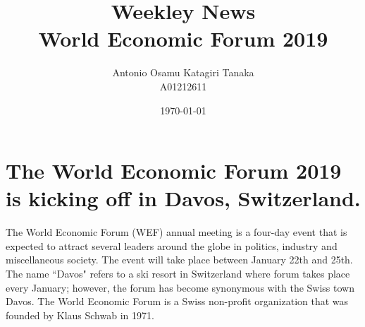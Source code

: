 \documentclass[11pt,a4paper]{article}
\title
{
    Weekley News \\
    World Economic Forum 2019
}
\author
{
    Antonio Osamu Katagiri Tanaka \\
    A01212611
}
\date{\today}
\providecommand{\keywords}[1]
{
    \\
    \\
    \small
    \textbf{\textit{Keywords:}} #1
}
\begin{document}

\maketitle








\section*{The World Economic Forum 2019 is kicking off in Davos, Switzerland.}\label{sec:intro}

The World Economic Forum (WEF) annual meeting is a four-day event that is expected to attract several leaders around the globe in politics, industry and miscellaneous society. The event will take place between January 22th and 25th. The name ``Davos" refers to a ski resort in Switzerland where forum takes place every January; however, the forum has become synonymous with the Swiss town Davos. The World Economic Forum is a Swiss non-profit organization that was founded by Klaus Schwab in 1971. \parencite{Schulze2018}
\end{document}

